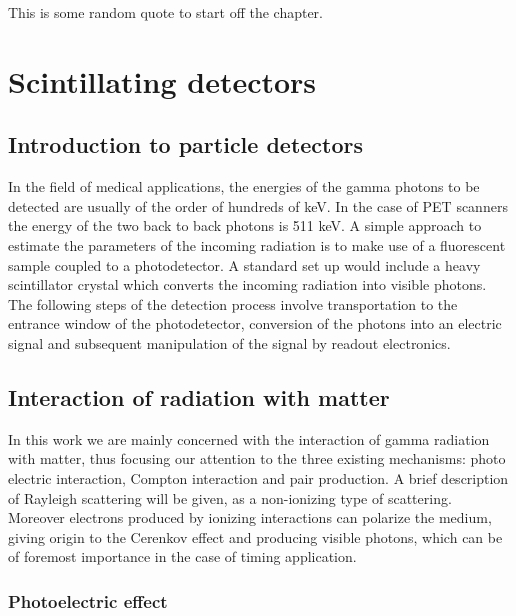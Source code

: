 \begin{savequote}[75mm] 
This is some random quote to start off the chapter.
\end{savequote}


\chapter{Scintillating detectors}

\section{Introduction to particle detectors}
In the field of medical applications, the energies of the gamma photons to be detected are usually of the order of hundreds of keV. In the case of PET scanners the energy of the two back to back photons is 511 keV.
A simple approach to estimate the parameters of the incoming radiation is to make use of a fluorescent sample coupled to a photodetector. A standard set up would include a heavy scintillator crystal which converts the incoming radiation into visible photons. The following steps of the detection process involve transportation to the entrance window of the photodetector, conversion of the photons into an electric signal and subsequent manipulation of the signal by readout electronics.  


\section{Interaction of radiation with matter}
In this work we are mainly concerned with the interaction of gamma radiation with matter, thus focusing our attention to the three existing mechanisms: photo electric interaction, Compton interaction and pair production. A brief description of Rayleigh scattering will be given, as a non-ionizing type of scattering.
Moreover electrons produced by ionizing interactions can polarize the medium, giving origin to the Cerenkov effect and producing visible photons, which can be of foremost importance in the case of timing application.

\subsection{Photoelectric effect}

